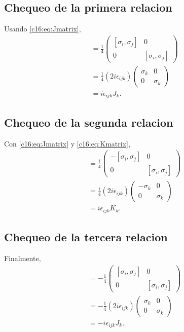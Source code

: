 \subsection{Chequeo de la primera relacion}
Usando \eqref{c16:eq:Jmatrix},
\begin{align}
[J_i,J_j]
&=
\frac{1}{4}
\begin{pmatrix}
[\sigma_i,\sigma_j] & 0\\
0 & [\sigma_i,\sigma_j]
\end{pmatrix}
\\
&=
\frac{1}{4}(2i\epsilon_{ijk})
\begin{pmatrix}
\sigma_k & 0\\
0 & \sigma_k
\end{pmatrix}
\\
&=
i\epsilon_{ijk}J_k.
\end{align}

\subsection{Chequeo de la segunda relacion}
Con \eqref{c16:eq:Jmatrix} y \eqref{c16:eq:Kmatrix},
\begin{align}
[J_i,K_j]
&=
\frac{i}{4}
\begin{pmatrix}
-[\sigma_i,\sigma_j] & 0\\
0 & [\sigma_i,\sigma_j]
\end{pmatrix}
\\
&=
\frac{i}{4}(2i\epsilon_{ijk})
\begin{pmatrix}
-\sigma_k & 0\\
0 & \sigma_k
\end{pmatrix}
\\
&=
i\epsilon_{ijk}K_k.
\end{align}

\subsection{Chequeo de la tercera relacion}
Finalmente,
\begin{align}
[K_i,K_j]
&=
-\frac{1}{4}
\begin{pmatrix}
[\sigma_i,\sigma_j] & 0\\
0 & [\sigma_i,\sigma_j]
\end{pmatrix}
\\
&=
-\frac{1}{4}(2i\epsilon_{ijk})
\begin{pmatrix}
\sigma_k & 0\\
0 & \sigma_k
\end{pmatrix}
\\
&=
-i\epsilon_{ijk}J_k.
\end{align}

